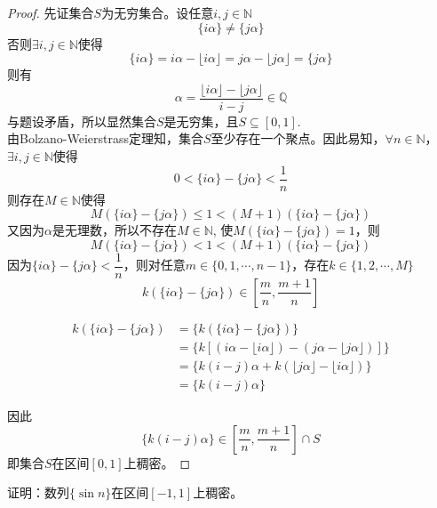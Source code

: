 \begin{proof}

    先证集合$S$为无穷集合。设任意$i, j \in \mathbb{N}$
    \[\{i\alpha\} \neq \{j\alpha\}\]
    否则$\exists i, j \in \mathbb{N}$使得
    \[\{i\alpha\} = i\alpha - \lfloor i\alpha \rfloor = j\alpha - \lfloor j\alpha \rfloor = \{j\alpha\}\]
    则有
    \[\alpha = \dfrac{\lfloor i\alpha \rfloor - \lfloor j\alpha \rfloor}{i - j} \in \mathbb{Q}\]
    与题设矛盾，所以显然集合$S$是无穷集，且$S \subseteq [0, 1]$. \\
    由\textup{Bolzano-Weierstrass}定理知，集合$S$至少存在一个聚点。因此易知，$\forall n \in \mathbb{N}$，$\exists i, j \in \mathbb{N}$使得
    \[0 < \{i\alpha\} - \{j\alpha\} < \dfrac{1}{n}\]
    则存在$M \in \mathbb{N}$使得
    \[M(\{i\alpha\} - \{j\alpha\}) \leq 1 < (M + 1)(\{i\alpha\} - \{j\alpha\})\]
    又因为$\alpha$是无理数，所以不存在$M \in \mathbb{N}$, 使$M(\{i\alpha\} - \{j\alpha\}) = 1$，则
    \[M(\{i\alpha\} - \{j\alpha\}) < 1 < (M + 1)(\{i\alpha\} - \{j\alpha\})\]
    因为$\{i\alpha\} - \{j\alpha\} < \dfrac{1}{n}$，则对任意$m \in \{0, 1, \cdots, n - 1\}$，存在$k \in \{1, 2, \cdots, M\}$
    \[k(\{i\alpha\} - \{j\alpha\}) \in \left[ \dfrac{m}{n}, \dfrac{m + 1}{n} \right]\]

    \begin{align*}
        k (\{ i \alpha \} - \{ j \alpha \}) & = \{ k (\{ i \alpha \} - \{ j \alpha \}) \} \\
        & = \{ k [(i \alpha - \lfloor i \alpha \rfloor) - (j \alpha - \lfloor j \alpha \rfloor)] \} \\
        & = \{ k (i - j) \alpha + k (\lfloor j \alpha \rfloor - \lfloor i \alpha \rfloor) \} \\
        & = \{ k (i - j) \alpha \}
    \end{align*}

    因此
    \[\{ k (i - j) \alpha \} \in \! \left[ \dfrac{m}{n}, \dfrac{m + 1}{n} \right] \cap S\]
    即集合$S$在区间$[0, 1]$上稠密。

\end{proof}

\begin{proposition}

    证明：数列$\{\sin{n}\}$在区间$[-1, 1]$上稠密。

\end{proposition}

